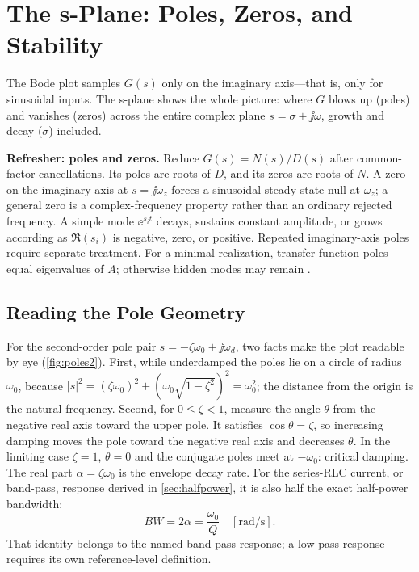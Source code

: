 \section{The s-Plane: Poles, Zeros, and Stability}
The Bode plot samples \(G(s)\) only on the imaginary axis---that is, only for
sinusoidal inputs. The s-plane shows the whole picture: where \(G\) blows up
(poles) and vanishes (zeros) across the entire complex plane
\(s=\sigma+\jj\omega\), growth and decay (\(\sigma\)) included.

\begin{controlsbox}
\textbf{Refresher: poles and zeros.} Reduce \(G(s)=N(s)/D(s)\) after common-factor
cancellations. Its poles are roots of \(D\), and its zeros are roots of \(N\). A
zero on the imaginary axis at \(s=\jj\omega_z\) forces a sinusoidal steady-state
null at \(\omega_z\); a general zero is a complex-frequency property rather than
an ordinary rejected frequency. A simple mode \(\ee^{s_i t}\) decays, sustains
constant amplitude, or grows according as \(\Re(s_i)\) is negative, zero, or
positive. Repeated imaginary-axis poles require separate treatment. For a minimal
realization, transfer-function poles equal eigenvalues of \(A\); otherwise hidden
modes may remain \cite[pp.~32--35, 264--266]{leigh2012control}.
\end{controlsbox}

\subsection{Reading the Pole Geometry}
\label{sec:polegeometry}
For the second-order pole pair \(s=-\zeta\omega_0\pm\jj\omega_d\), two facts make
the plot readable by eye (\cref{fig:poles2}). First, while underdamped the poles
lie on a circle of radius \(\omega_0\), because
\(|s|^2=(\zeta\omega_0)^2+(\omega_0\sqrt{1-\zeta^2})^2=\omega_0^2\); the distance
from the origin is the natural frequency. Second, for \(0\le\zeta<1\), measure
the angle \(\theta\) from the negative real axis toward the upper pole. It
satisfies \(\cos\theta=\zeta\), so increasing damping moves the pole toward the
negative real axis and decreases \(\theta\). In the limiting case
\(\zeta=1\), \(\theta=0\) and the conjugate poles meet at \(-\omega_0\): critical
damping. The real part \(\alpha=\zeta\omega_0\) is the envelope decay rate. For
the series-RLC current, or band-pass, response derived in \cref{sec:halfpower}, it
is also half the exact half-power bandwidth:
\[
BW=2\alpha=\frac{\omega_0}{Q}\quad[\si{\radian\per\second}].
\]
That identity belongs to the named band-pass response; a low-pass response requires
its own reference-level definition.

